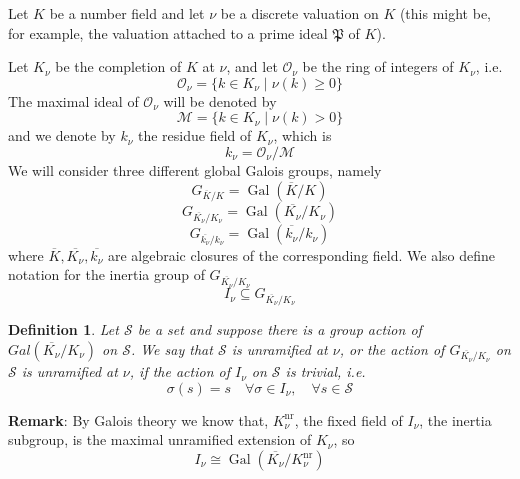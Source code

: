 \documentclass[12pt]{article}
\newtheorem{defn}{Definition}
\begin{document}
Let $K$ be a number field and let $\nu$ be a discrete valuation on
$K$ (this might be, for example, the valuation attached to a prime
ideal $\mathfrak{P}$ of $K$).

Let $K_{\nu}$ be the completion of $K$ at $\nu$, and let
$\mathcal{O}_{\nu}$ be the ring of integers of $K_{\nu}$, i.e.
$$\mathcal{O}_{\nu}=\{ k\in K_{\nu} \mid \nu(k)\geq 0 \}$$
The maximal ideal of $\mathcal{O}_{\nu}$ will be denoted by
$$\mathcal{M}=\{ k\in K_{\nu} \mid \nu(k)>0 \}$$
and we denote by $k_{\nu}$ the residue field of $K_{\nu}$, which
is
$$k_{\nu}=\mathcal{O}_{\nu}/\mathcal{M}$$
We will consider three different global Galois groups, namely
$$G_{\overline{K}/K}=\operatorname{Gal}(\overline{K}/K)$$
$$G_{\overline{K_{\nu}}/K_{\nu}}=\operatorname{Gal}(\overline{K_{\nu}}/K_{\nu})$$
$$G_{\overline{k_{\nu}}/k_{\nu}}=\operatorname{Gal}(\overline{k_{\nu}}/k_{\nu})$$
where $\overline{K},\overline{K_{\nu}},\overline{k_{\nu}}$ are  algebraic closures of the corresponding field. We also
define notation for the inertia group of
$G_{\overline{K_{\nu}}/K_{\nu}}$
$$I_{\nu} \subseteq G_{\overline{K_{\nu}}/K_{\nu}}$$

\begin{defn}
Let $\mathcal{S}$ be a set and suppose there is a group action of
$Gal(\overline{K_{\nu}}/K_{\nu})$ on $\mathcal{S}$. We say that
$\mathcal{S}$ is \emph{unramified} at $\nu$, or the action of
$G_{\overline{K_{\nu}}/K_{\nu}}$ on $\mathcal{S}$ is unramified at
$\nu$, if the action of $I_{\nu}$ on $\mathcal{S}$ is trivial,
i.e.
$$\sigma(s)=s\quad \forall \sigma \in I_{\nu},\quad \forall s\in \mathcal{S}$$
\end{defn}

{\bf Remark}: By Galois theory we know that,
$K_{\nu}^{\operatorname{nr}}$, the fixed field of $I_{\nu}$, the
inertia subgroup, is the maximal unramified extension of
$K_{\nu}$, so
$$I_{\nu}\cong
\operatorname{Gal}(\overline{K_{\nu}}/K_{\nu}^{\operatorname{nr}})$$
\end{document}
